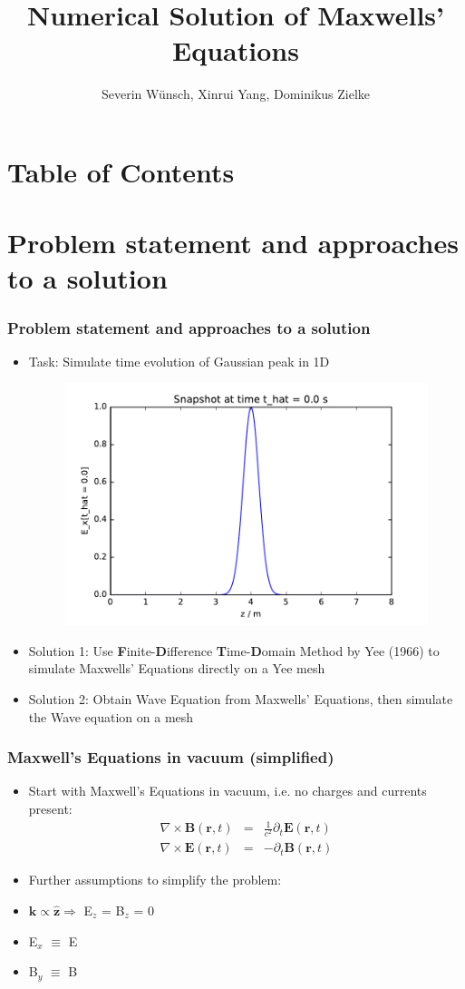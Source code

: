 \documentclass[ignorenonframetext]{beamer}
\title[]{Numerical Solution of Maxwells' Equations}
\subtitle{}
\author[Wünsch, Yang, Zielke]{\large{Severin Wünsch, Xinrui Yang, Dominikus Zielke} \\
}
\institute[Universität Augsburg]{Institut für Physik der Universität Augsburg}
\date[29.07.2016]
\begin{document}
\frame[plain]{\titlepage}

\section*{Table of Contents}
\begin{frame}
\tableofcontents[]
\end{frame}

\section{Problem statement and approaches to a solution}
\begin{frame}
\frametitle{Problem statement and approaches to a solution}
\begin{itemize}
\item Task: Simulate time evolution of Gaussian peak in 1D
\begin{figure}
\centering
\includegraphics[width=0.7\linewidth]{problem_statement}
\label{fig:yee_mesh}
\end{figure}
\item Solution 1: Use \textbf{F}inite-\textbf{D}ifference \textbf{T}ime-\textbf{D}omain Method by Yee (1966) to simulate Maxwells' Equations directly on a Yee mesh
\item Solution 2: Obtain Wave Equation from Maxwells' Equations, then simulate the Wave equation on a mesh
\end{itemize}
\end{frame}

\begin{frame}
\frametitle{Maxwell's Equations in vacuum (simplified)}
\begin{itemize}
\item Start with Maxwell's Equations in vacuum, i.e. no charges and currents present:
\begin{eqnarray}
\nabla \times \boldsymbol{B}(\boldsymbol{r},t) &=& \frac{1}{c^2}\partial_t{\boldsymbol{E}}(\boldsymbol{r},t)\nonumber\\
\nabla \times \boldsymbol{E}(\boldsymbol{r},t) &=& -\partial_t{\boldsymbol{B}}(\boldsymbol{r}, t)
\end{eqnarray}
\item Further assumptions to simplify the problem:
\item $\boldsymbol{k} \propto \hat{\boldsymbol{z}} \Rightarrow $ E$_z$ = B$_z$ = 0   
\item E$_x$ $\equiv$ E 
\item B$_y$ $\equiv$ B
\end{itemize}
\end{frame}
\end{document}
